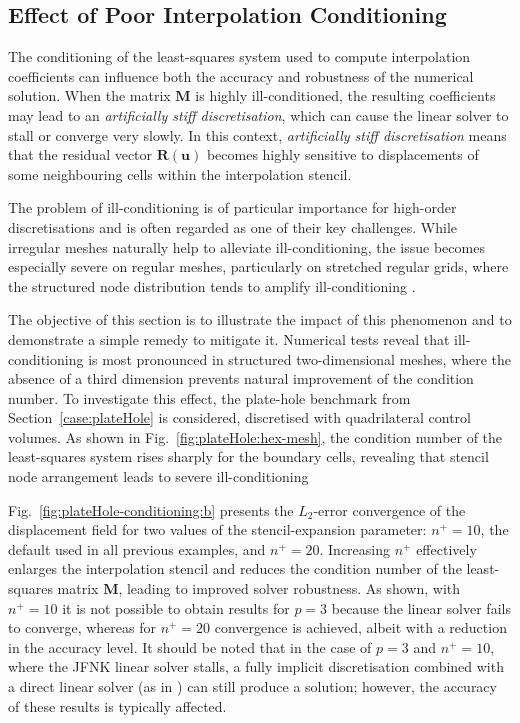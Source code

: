\documentclass[review,3p]{elsarticle}
\newcommand{\bb}{\boldsymbol}
\begin{document}
\subsection{Effect of Poor Interpolation Conditioning}
%
The conditioning of the least-squares system used to compute interpolation coefficients can influence both the accuracy and robustness of the numerical solution. 
When the matrix ${\mathbf{M}}$ is highly ill-conditioned, the resulting coefficients may lead to an \emph{artificially stiff discretisation},
which can cause the linear solver to stall or converge very slowly. 
In this context, \emph{artificially stiff discretisation} means that the residual vector $\bb{R}(\bb{u})$ becomes highly sensitive to displacements of some neighbouring cells within the interpolation stencil.

The problem of ill-conditioning is of particular importance for high-order discretisations and is often regarded as one of their key challenges. While irregular meshes naturally help to alleviate ill-conditioning, the issue becomes especially severe on regular meshes, particularly on stretched regular grids, where the structured node distribution tends to amplify ill-conditioning \cite{Gooch2002, jalali2013}.

The objective of this section is to illustrate the impact of this phenomenon and to demonstrate a simple remedy to mitigate it. Numerical tests reveal that ill-conditioning is most pronounced in structured two-dimensional meshes, where the absence of a third dimension prevents natural improvement of the condition number. To investigate this effect, the plate-hole benchmark from Section~\ref{case:plateHole} is considered, discretised with quadrilateral control volumes. As shown in Fig.~\ref{fig:plateHole:hex-mesh}, the condition number of the least-squares system rises sharply for the boundary cells, revealing that stencil node arrangement leads to severe ill-conditioning

Fig.~\ref{fig:plateHole-conditioning:b} presents the $L_2$-error convergence of the displacement field for two values of the stencil-expansion parameter: $n^+ = 10$, the default used in all previous examples, and $n^+ = 20$. Increasing $n^+$ effectively enlarges the interpolation stencil and reduces the condition number of the least-squares matrix ${\mathbf{M}}$, leading to improved solver robustness. As shown, with $n^+ = 10$ it is not possible to obtain results for $p = 3$ because the linear solver fails to converge, whereas for $n^+ = 20$ convergence is achieved, albeit with a reduction in the accuracy level.
It should be noted that in the case of $p = 3$ and $n^+ = 10$, where the JFNK linear solver stalls, a fully implicit discretisation combined with a direct linear solver (as in \cite{Castrillo2022, Castrillo2024}) can still produce a solution; however, the accuracy of these results is typically affected.
\end{document}
